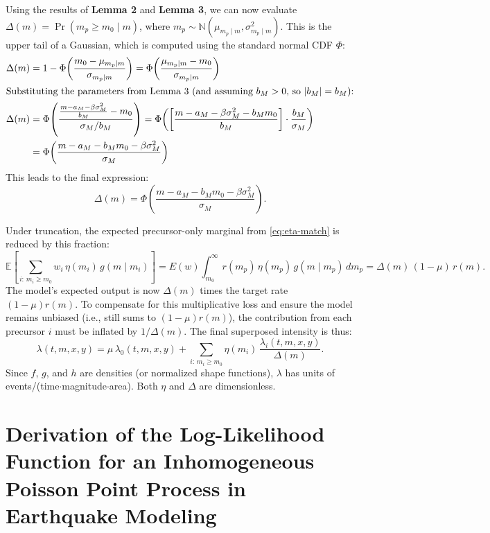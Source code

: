 \documentclass[extra,mreferee]{gji}
\theoremstyle{lemma}
\def\N{\mathbb{N}}
\begin{document}
Using the results of \textbf{Lemma 2} and \textbf{Lemma 3}, we can now evaluate $\Delta(m) = \Pr(m_p\ge m_0\mid m)$, where $m_p \sim \N(\mu_{m_p\mid m}, \sigma_{m_p\mid m}^2)$. This is the upper tail of a Gaussian, which is computed using the standard normal CDF $\Phi$:
\begin{align}
  \Delta(m) &= 1 - \Phi\!\left(\frac{m_0 - \mu_{m_p\mid m}}{\sigma_{m_p\mid m}}\right)
          = \Phi\!\left(\frac{\mu_{m_p\mid m}-m_0}{\sigma_{m_p\mid m}}\right) \nonumber \\
\intertext{Substituting the parameters from Lemma 3 (and assuming $b_M > 0$, so $|b_M|=b_M$):}
  \Delta(m) &= \Phi\!\left(\frac{ \frac{m-a_M-\beta\sigma_M^2}{b_M} - m_0}{\sigma_M / b_M}\right) 
          = \Phi\!\left( \left[ \frac{m-a_M-\beta\sigma_M^2 - b_M m_0}{b_M} \right] \cdot \frac{b_M}{\sigma_M} \right) \nonumber \\
          &= \Phi\!\left(\frac{m-a_M-b_M m_0-\beta\sigma_M^2}{\sigma_M}\right) \nonumber
\end{align}
This leads to the final expression:
\begin{equation}\label{eq:Delta-final}
  \boxed{\quad
  \Delta(m) = \Phi\!\left(\frac{m-a_M-b_M m_0-\beta\sigma_M^2}{\sigma_M}\right).\quad}
\end{equation}

Under truncation, the expected precursor-only marginal from \eqref{eq:eta-match} is reduced by this fraction:
\[
  \mathbb{E}\!\left[\sum_{i:\,m_i\ge m_0} w_i\,\eta(m_i)\,g(m\mid m_i)\right]
  =E(w)\int_{m_0}^{\infty} r(m_p)\,\eta(m_p)\,g(m\mid m_p)\,dm_p
  =\Delta(m)\,(1-\mu)\,r(m).
\]
The model's expected output is now $\Delta(m)$ times the target rate $(1-\mu)r(m)$. To compensate for this multiplicative loss and ensure the model remains unbiased (i.e., still sums to $(1-\mu)r(m)$), the contribution from each precursor $i$ must be inflated by $1/\Delta(m)$. The final superposed intensity is thus:
\begin{equation}\label{eq:lambda-superpose}
  \lambda(t,m,x,y)=\mu\,\lambda_0(t,m,x,y)+
  \sum_{i:\,m_i\ge m_0}\eta(m_i)\,
  \frac{\lambda_i(t,m,x,y)}{\Delta(m)}.
\end{equation}
Since $f$, $g$, and $h$ are densities (or normalized shape functions), $\lambda$ has units of
events/(time$\cdot$magnitude$\cdot$area). Both $\eta$ and $\Delta$ are dimensionless. 

\section{Derivation of the Log-Likelihood Function for an Inhomogeneous Poisson Point Process in Earthquake Modeling} \label{sec:derive_loglikelihood}
\end{document}
